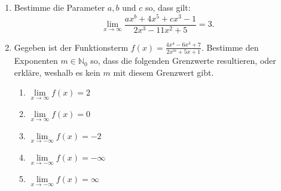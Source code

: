 \begin{ueb}
\begin{enumerate}
\begin{enumerate}
    \item $\lim\limits_{x \to \infty} \frac{2x^6 - 3x^5 + 7x^3 + 4x - 8}{5x^6 + 8x^5 - 9x^4 + 11x^2}$, \quad $\lim\limits_{x \to -\infty} \frac{2x^6 - 3x^5 + 7x^3 + 4x - 8}{5x^6 + 8x^5 - 9x^4 + 11x^2}$
    \item $\lim\limits_{x \to \infty} \frac{10x^8 - 4x^7 + 12}{x^9 + 3x^6 + 4}$, \quad $\lim\limits_{x \to -\infty} \frac{10x^8 - 4x^7 + 12}{x^9 + 3x^6 + 4}$
    \item  $\lim\limits_{x \to \infty} \frac{10x^8 - 4x^7 + 12}{x^7 + 3x^6 + 4}$, \quad $\lim\limits_{x \to -\infty} \frac{10x^8 - 4x^7 + 12}{x^7+ 3x^6 + 4}$
    \item   $\lim\limits_{x \to \infty} \frac{10x^8 - 4x^7 + 12}{ 3x^6 + 4}$, \quad $\lim\limits_{x \to -\infty} \frac{10x^8 - 4x^7 + 12}{3x^6 + 4}$
    \item $\lim\limits_{x \to \infty} \frac{\sqrt{x + 1}}{x - 1}$, \quad $\lim\limits_{x \to -\infty} \frac{\sqrt{x + 1}}{x - 1}$
    \item $\lim\limits_{x \to \infty} \frac{x^9 + x^4}{e^x}$, \quad $\lim\limits_{x \to -\infty} \frac{x^9 + x^4}{e^x}$
\end{enumerate}
\item Bestimme die Parameter $a, b$ und $c$ so, dass gilt:
    \[ \lim\limits_{x \to \infty} \frac{ax^b + 4x^5 + cx^3 - 1}{2x^3 - 11x^2 + 5} = 3. \]
\item  Gegeben ist der Funktionsterm $f(x) = \frac{4x^4 - 6x^3 + 7}{2x^m + 5x + 1}$. Bestimme den Exponenten $m \in \mathbb{N}_0$ so, dass die folgenden Grenzwerte resultieren, oder erkläre, weshalb es kein $m$ mit diesem Grenzwert gibt.
\begin{enumerate}
    \item $\lim\limits_{x \to \infty} f(x) = 2$
    \item $\lim\limits_{x \to \infty} f(x) = 0$
    \item $\lim\limits_{x \to -\infty} f(x) = -2$
    \item $\lim\limits_{x \to -\infty} f(x) = -\infty$
    \item $\lim\limits_{x \to -\infty} f(x) = \infty$
\end{enumerate}
   \end{enumerate}
\end{ueb}

